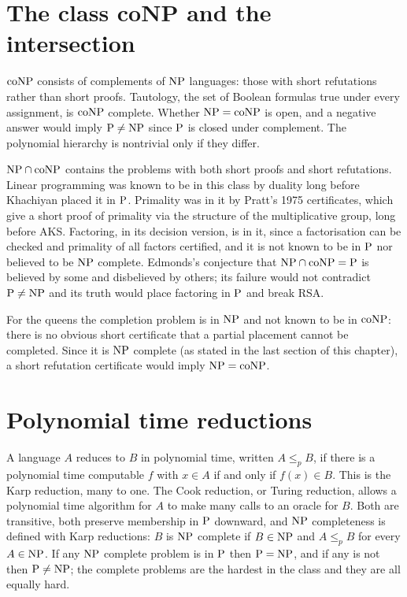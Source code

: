 \section{The class coNP and the intersection}

$\mathrm{co}\mathrm{NP}$ consists of complements of $\mathrm{NP}$ languages: those with short refutations rather than short proofs. Tautology, the set of Boolean formulas true under every assignment, is $\mathrm{co}\mathrm{NP}$ complete. Whether $\mathrm{NP} = \mathrm{co}\mathrm{NP}$ is open, and a negative answer would imply $\mathrm{P} \neq \mathrm{NP}$ since $\mathrm{P}$ is closed under complement. The polynomial hierarchy is nontrivial only if they differ.

$\mathrm{NP} \cap \mathrm{co}\mathrm{NP}$ contains the problems with both short proofs and short refutations. Linear programming was known to be in this class by duality long before Khachiyan placed it in $\mathrm{P}$. Primality was in it by Pratt's 1975 certificates, which give a short proof of primality via the structure of the multiplicative group, long before AKS. Factoring, in its decision version, is in it, since a factorisation can be checked and primality of all factors certified, and it is not known to be in $\mathrm{P}$ nor believed to be $\mathrm{NP}$ complete. Edmonds's conjecture that $\mathrm{NP} \cap \mathrm{co}\mathrm{NP} = \mathrm{P}$ is believed by some and disbelieved by others; its failure would not contradict $\mathrm{P} \neq \mathrm{NP}$ and its truth would place factoring in $\mathrm{P}$ and break RSA.

For the queens the completion problem is in $\mathrm{NP}$ and not known to be in $\mathrm{co}\mathrm{NP}$: there is no obvious short certificate that a partial placement cannot be completed. Since it is $\mathrm{NP}$ complete (as stated in the last section of this chapter), a short refutation certificate would imply $\mathrm{NP} = \mathrm{co}\mathrm{NP}$.

\section{Polynomial time reductions}

A language $A$ reduces to $B$ in polynomial time, written $A \le_p B$, if there is a polynomial time computable $f$ with $x \in A$ if and only if $f(x) \in B$. This is the Karp reduction, many to one. The Cook reduction, or Turing reduction, allows a polynomial time algorithm for $A$ to make many calls to an oracle for $B$. Both are transitive, both preserve membership in $\mathrm{P}$ downward, and $\mathrm{NP}$ completeness is defined with Karp reductions: $B$ is $\mathrm{NP}$ complete if $B \in \mathrm{NP}$ and $A \le_p B$ for every $A \in \mathrm{NP}$. If any $\mathrm{NP}$ complete problem is in $\mathrm{P}$ then $\mathrm{P} = \mathrm{NP}$, and if any is not then $\mathrm{P} \neq \mathrm{NP}$; the complete problems are the hardest in the class and they are all equally hard.

